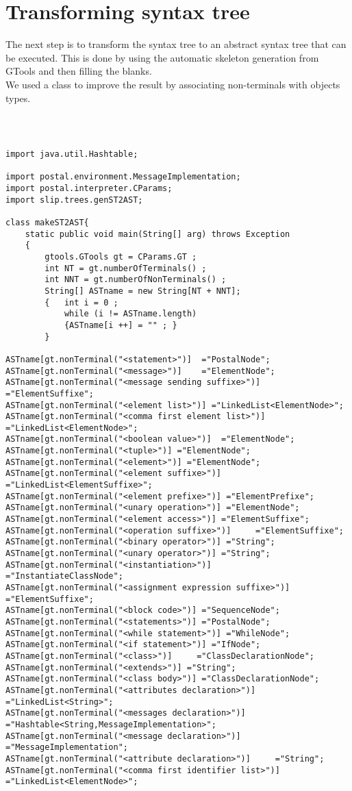 \documentclass{eplDoc}
\begin{document}
\section{Transforming syntax tree}
The next step is to transform the syntax tree to an abstract syntax tree that can be executed.
This is done by using the automatic skeleton generation from GTools and then filling the blanks.\\
We used a class to improve the result by associating non-terminals with objects types.
\begin{lstlisting}
    


import java.util.Hashtable;

import postal.environment.MessageImplementation;
import postal.interpreter.CParams;
import slip.trees.genST2AST;

class makeST2AST{
	static public void main(String[] arg) throws Exception
	{
		gtools.GTools gt = CParams.GT ;
		int NT = gt.numberOfTerminals() ;
		int NNT = gt.numberOfNonTerminals() ;
		String[] ASTname = new String[NT + NNT];
		{	int i = 0 ;
			while (i != ASTname.length)
			{ASTname[i ++] = "" ; }	
		}
		
ASTname[gt.nonTerminal("<statement>")]	="PostalNode";
ASTname[gt.nonTerminal("<message>")] 	="ElementNode";
ASTname[gt.nonTerminal("<message sending suffixe>")] ="ElementSuffixe";
ASTname[gt.nonTerminal("<element list>")] ="LinkedList<ElementNode>";
ASTname[gt.nonTerminal("<comma first element list>")] ="LinkedList<ElementNode>";
ASTname[gt.nonTerminal("<boolean value>")] 	="ElementNode";
ASTname[gt.nonTerminal("<tuple>")] ="ElementNode";
ASTname[gt.nonTerminal("<element>")] ="ElementNode";
ASTname[gt.nonTerminal("<element suffixe>")] ="LinkedList<ElementSuffixe>";  
ASTname[gt.nonTerminal("<element prefixe>")] ="ElementPrefixe";
ASTname[gt.nonTerminal("<unary operation>")] ="ElementNode";
ASTname[gt.nonTerminal("<element access>")] ="ElementSuffixe";
ASTname[gt.nonTerminal("<operation suffixe>")]     ="ElementSuffixe";
ASTname[gt.nonTerminal("<binary operator>")] ="String";
ASTname[gt.nonTerminal("<unary operator>")] ="String";
ASTname[gt.nonTerminal("<instantiation>")]     ="InstantiateClassNode";
ASTname[gt.nonTerminal("<assignment expression suffixe>")]  ="ElementSuffixe";
ASTname[gt.nonTerminal("<block code>")] ="SequenceNode";
ASTname[gt.nonTerminal("<statements>")] ="PostalNode";
ASTname[gt.nonTerminal("<while statement>")] ="WhileNode";
ASTname[gt.nonTerminal("<if statement>")] ="IfNode";
ASTname[gt.nonTerminal("<class>")]     ="ClassDeclarationNode";
ASTname[gt.nonTerminal("<extends>")] ="String";
ASTname[gt.nonTerminal("<class body>")] ="ClassDeclarationNode";
ASTname[gt.nonTerminal("<attributes declaration>")] ="LinkedList<String>";
ASTname[gt.nonTerminal("<messages declaration>")] ="Hashtable<String,MessageImplementation>";
ASTname[gt.nonTerminal("<message declaration>")] ="MessageImplementation";
ASTname[gt.nonTerminal("<attribute declaration>")]     ="String";
ASTname[gt.nonTerminal("<comma first identifier list>")] ="LinkedList<ElementNode>";


\end{lstlisting}
\end{document}
